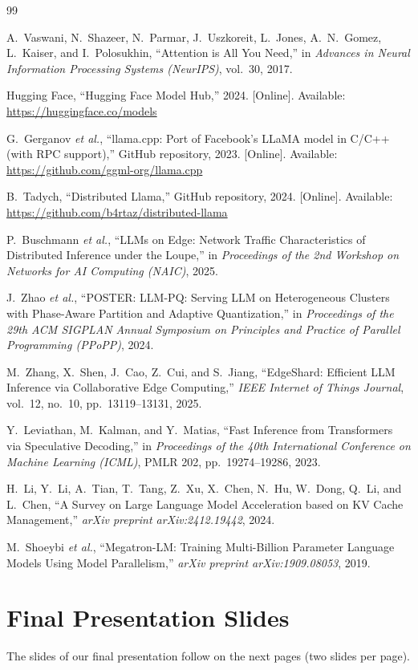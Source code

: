 \documentclass[11pt,a4paper]{article}
\begin{document}
\begin{thebibliography}{99}

A.~Vaswani, N.~Shazeer, N.~Parmar, J.~Uszkoreit, L.~Jones, A.~N.~Gomez, L.~Kaiser, and I.~Polosukhin,
``Attention is All You Need,''
in \emph{Advances in Neural Information Processing Systems (NeurIPS)}, vol.~30, 2017.

Hugging Face,
``Hugging Face Model Hub,''
2024. [Online]. Available: \url{https://huggingface.co/models}

G.~Gerganov \emph{et al.},
``llama.cpp: Port of Facebook's LLaMA model in C/C++ (with RPC support),''
GitHub repository, 2023. [Online]. Available: \url{https://github.com/ggml-org/llama.cpp}

B.~Tadych,
``Distributed Llama,''
GitHub repository, 2024. [Online]. Available: \url{https://github.com/b4rtaz/distributed-llama}

P.~Buschmann \emph{et al.},
``LLMs on Edge: Network Traffic Characteristics of Distributed Inference under the Loupe,''
in \emph{Proceedings of the 2nd Workshop on Networks for AI Computing (NAIC)}, 2025.

J.~Zhao \emph{et al.},
``POSTER: LLM-PQ: Serving LLM on Heterogeneous Clusters with Phase-Aware Partition and Adaptive Quantization,''
in \emph{Proceedings of the 29th ACM SIGPLAN Annual Symposium on Principles and Practice of Parallel Programming (PPoPP)}, 2024.

M.~Zhang, X.~Shen, J.~Cao, Z.~Cui, and S.~Jiang,
``EdgeShard: Efficient LLM Inference via Collaborative Edge Computing,''
\emph{IEEE Internet of Things Journal}, vol.~12, no.~10, pp.~13119--13131, 2025.

Y.~Leviathan, M.~Kalman, and Y.~Matias,
``Fast Inference from Transformers via Speculative Decoding,''
in \emph{Proceedings of the 40th International Conference on Machine Learning (ICML)}, PMLR 202, pp.~19274--19286, 2023.

H.~Li, Y.~Li, A.~Tian, T.~Tang, Z.~Xu, X.~Chen, N.~Hu, W.~Dong, Q.~Li, and L.~Chen,
``A Survey on Large Language Model Acceleration based on KV Cache Management,''
\emph{arXiv preprint arXiv:2412.19442}, 2024.

M.~Shoeybi \emph{et al.},
``Megatron-LM: Training Multi-Billion Parameter Language Models Using Model Parallelism,''
\emph{arXiv preprint arXiv:1909.08053}, 2019.

\end{thebibliography}
\appendix
\section{Final Presentation Slides}\label{app:slides}
The slides of our final presentation follow on the next pages (two slides per page).

\end{document}
